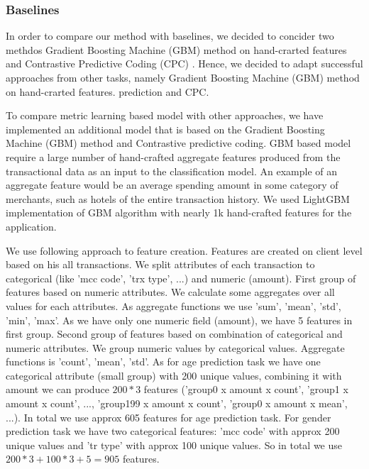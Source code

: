 \documentclass[sigconf, anonymous]{acmart}
\begin{document}
\subsubsection{Baselines} \label{sec-baselines}

In order to compare our method with baselines, we decided to concider two methdos Gradient Boosting Machine (GBM) method \cite{friedman2001} on hand-crarted features and Contrastive Predictive Coding (CPC) \cite{cp}. Hence, we decided to adapt successful approaches from other tasks, namely Gradient Boosting Machine (GBM) method \cite{friedman2001} on hand-crarted features. prediction and CPC.

To compare metric learning based model with other approaches, we have implemented an
additional model that is based on the Gradient Boosting Machine
(GBM) method \cite{friedman2001} and Contrastive predictive coding.
GBM based model require a large number of hand-crafted aggregate features produced from the transactional data as an input to the classification model. An example
of an aggregate feature would be an average spending amount in
some category of merchants, such as hotels of the entire transaction
history.
We used LightGBM\cite{NIPS2017_6907} implementation of GBM algorithm with nearly 1k hand-crafted features for the application.

We use following approach to feature creation. Features are created on client level based on his all transactions. We split attributes of each transaction to categorical (like 'mcc code', 'trx type', ...) and numeric (amount). First group of features based on numeric attributes. We calculate some aggregates over all values for each attributes. As aggregate functions we use 'sum', 'mean', 'std', 'min', 'max'. As we have only one numeric field (amount), we have 5 features in first group. Second group of features based on combination of categorical and numeric attributes. We group numeric values by categorical values. Aggregate functions is 'count', 'mean', 'std'. As for age prediction task we have one categorical attribute (small group) with 200 unique values, combining it with amount we can produce $200 * 3$ features ('group0 x amount x count',  'group1 x amount x count', ..., 'group199 x amount x count', 'group0 x amount x mean', ...). In total we use approx 605 features for age prediction task. For gender prediction task we have two categorical features: 'mcc code' with approx 200 unique values and 'tr type' with approx 100 unique values. So in total we use $200 * 3 + 100 * 3 + 5 = 905$ features.
\end{document}
